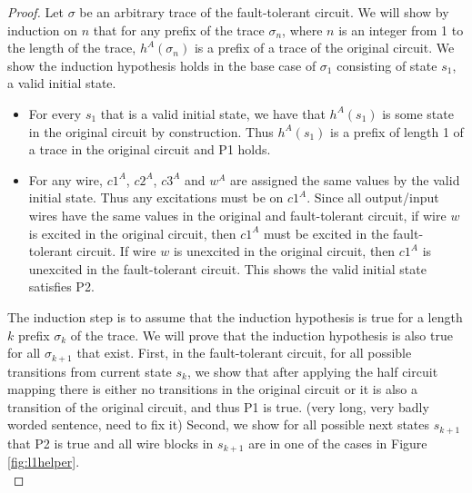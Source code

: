 \documentclass[12pt]{report}
\begin{document}
\begin{proof}
Let $\sigma$ be an arbitrary trace of the fault-tolerant circuit.  We will show by induction on $n$ 
that for any prefix of the trace $\sigma_n$, where $n$ is an integer from 1 to the length of the trace, $h^A(\sigma_n)$ is a prefix of a trace of the original circuit.
We show the induction hypothesis holds in the base case of $\sigma_1$ consisting of state $s_1$, a valid initial state.
\begin{itemize}
\item For every $s_1$ that is a valid initial state, we have that $h^A(s_1)$ is some state in the original circuit by construction.  Thus $h^A(s_1)$ is a prefix of length 1 of a trace in the original circuit and P1 holds.
\item 
For any wire, $c1^A$, $c2^A$, $c3^A$ and $w^A$ are assigned the same values by the valid initial state.  Thus any excitations must be on $c1^A$. Since all output/input wires have the same values in the original and fault-tolerant circuit, if wire $w$ is excited in the original circuit, then $c1^A$ must be excited in the fault-tolerant circuit.  If wire $w$ is unexcited in the original circuit, then $c1^A$ is unexcited in the fault-tolerant circuit.  This shows the valid initial state satisfies P2.    %
\end{itemize}

The induction step is to assume that the induction hypothesis is true for a length $k$ prefix $\sigma_k$ of the trace.  We will prove that the induction hypothesis is also true for all $\sigma_{k+1}$ that exist.  First, in the fault-tolerant circuit, for all possible transitions from current state $s_k$, we show that after applying the half circuit mapping there is either no transitions in the original circuit or it is also a transition of the original circuit, and thus P1 is true. (very long, very badly worded sentence, need to fix it)  
Second, we show for all possible next states $s_{k+1}$ that P2 is true and all wire blocks in $s_{k+1}$ are in one of the cases in Figure \ref{fig:l1helper}.\\


\end{proof}
\end{document}
